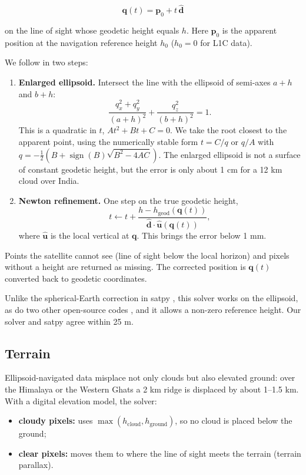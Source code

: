 \[
\mathbf{q}(t) = \mathbf{p}_0 + t\,\hat{\mathbf{d}}
\]

on the line of sight whose geodetic height equals \(h\). Here \(\mathbf{p}_0\) is the apparent position at the navigation reference height \(h_0\) (\(h_0 = 0\) for L1C data).

We follow \citet{bielinski2020} in two steps:

\begin{enumerate}
\def\labelenumi{\arabic{enumi}.}
\tightlist
\item
  \textbf{Enlarged ellipsoid.} Intersect the line with the ellipsoid of semi-axes \(a + h\) and \(b + h\): \[
  \frac{q_x^2 + q_y^2}{(a + h)^2} + \frac{q_z^2}{(b + h)^2} = 1.
  \] This is a quadratic in \(t\), \(A t^2 + B t + C = 0\). We take the root closest to the apparent point, using the numerically stable form \(t = C/q\) or \(q/A\) with \(q = -\tfrac{1}{2}\left(B + \operatorname{sign}(B)\sqrt{B^2 - 4AC}\right)\). The enlarged ellipsoid is not a surface of constant geodetic height, but the error is only about 1 cm for a 12 km cloud over India.
\item
  \textbf{Newton refinement.} One step on the true geodetic height, \[
  t \leftarrow t + \frac{h - h_{\mathrm{geod}}(\mathbf{q}(t))}{\hat{\mathbf{d}}\cdot\hat{\mathbf{u}}(\mathbf{q}(t))},
  \] where \(\hat{\mathbf{u}}\) is the local vertical at \(\mathbf{q}\). This brings the error below 1 mm.
\end{enumerate}

Points the satellite cannot see (line of sight below the local horizon) and pixels without a height are returned as missing. The corrected position is \(\mathbf{q}(t)\) converted back to geodetic coordinates.

Unlike the spherical-Earth correction in satpy \citep{raspaud2018}, this solver works on the ellipsoid, as do two other open-source codes \citep{pyparallax,tsujino2026}, and it allows a non-zero reference height. Our solver and satpy agree within 25 m.

\subsection{Terrain}\label{sec:3.4}

Ellipsoid-navigated data misplace not only clouds but also elevated ground: over the Himalaya or the Western Ghats a 2 km ridge is displaced by about 1--1.5 km. With a digital elevation model, the solver:

\begin{itemize}
\tightlist
\item
  \textbf{cloudy pixels:} uses \(\max(h_{\mathrm{cloud}}, h_{\mathrm{ground}})\), so no cloud is placed below the ground;
\item
  \textbf{clear pixels:} moves them to where the line of sight meets the terrain (terrain parallax).
\end{itemize}

